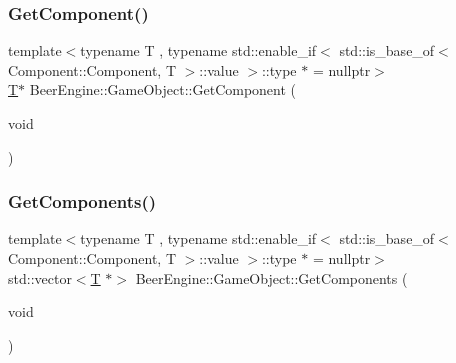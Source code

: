 \mbox{\label{class_beer_engine_1_1_game_object_a70a24bb3e511f2ff0488b80c65e88f9f}} 
\subsubsection{\texorpdfstring{Get\+Component()}{GetComponent()}}
{\footnotesize\ttfamily template$<$typename T , typename std\+::enable\+\_\+if$<$ std\+::is\+\_\+base\+\_\+of$<$ Component\+::\+Component, T $>$\+::value $>$\+::type $\ast$  = nullptr$>$ \\
\mbox{\hyperlink{namespace_beer_engine_a94f0b552f6dc910de8cdb44207981f53a8de48e594408f9fc561b2f68ce05f664}{T}}$\ast$ Beer\+Engine\+::\+Game\+Object\+::\+Get\+Component (\begin{DoxyParamCaption}\item[{void}]{ }\end{DoxyParamCaption})\hspace{0.3cm}{\ttfamily [inline]}}

\mbox{\label{class_beer_engine_1_1_game_object_acab5c2fff0115dcc68ce12c051d254a7}} 
\subsubsection{\texorpdfstring{Get\+Components()}{GetComponents()}\hspace{0.1cm}{\footnotesize\ttfamily [1/2]}}
{\footnotesize\ttfamily template$<$typename T , typename std\+::enable\+\_\+if$<$ std\+::is\+\_\+base\+\_\+of$<$ Component\+::\+Component, T $>$\+::value $>$\+::type $\ast$  = nullptr$>$ \\
std\+::vector$<$\mbox{\hyperlink{namespace_beer_engine_a94f0b552f6dc910de8cdb44207981f53a8de48e594408f9fc561b2f68ce05f664}{T}} $\ast$$>$ Beer\+Engine\+::\+Game\+Object\+::\+Get\+Components (\begin{DoxyParamCaption}\item[{void}]{ }\end{DoxyParamCaption})\hspace{0.3cm}{\ttfamily [inline]}}


